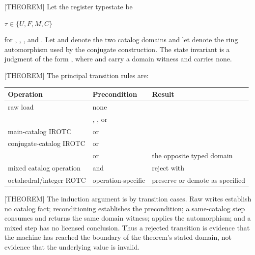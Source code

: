 \documentclass[11pt]{article}
\begin{document}
[THEOREM] Let the register typestate be

\(\tau \in \{U,F,M,C\}\)

for , , , and . Let  and  denote the two catalog domains and let  denote the ring automorphism used by the conjugate construction. The state invariant is a judgment of the form , where  and  carry a domain witness and  carries none.

[THEOREM] The principal transition rules are:

\begin{center}

\scriptsize

\sloppy

\renewcommand{\arraystretch}{1.15}
\begin{tabularx}{\linewidth}{@{}YYY@{}}

\toprule

Operation & Precondition & Result \\

\midrule

raw load & none &  \\

 & , , or  &  \\

main-catalog IROTC &  or  &  \\

conjugate-catalog IROTC &  or  &  \\

 &  or  & the opposite typed domain \\

mixed catalog operation &  and  & reject with  \\

octahedral/integer ROTC & operation-specific & preserve or demote as specified \\

\bottomrule

\end{tabularx}

\renewcommand{\arraystretch}{1.0}

\end{center}

[THEOREM] The induction argument is by transition cases. Raw writes establish no catalog fact; reconditioning establishes the  precondition; a same-catalog step consumes and returns the same domain witness;  applies the automorphism; and a mixed step has no licensed conclusion. Thus a rejected transition is evidence that the machine has reached the boundary of the theorem's stated domain, not evidence that the underlying value is invalid.
\end{document}
